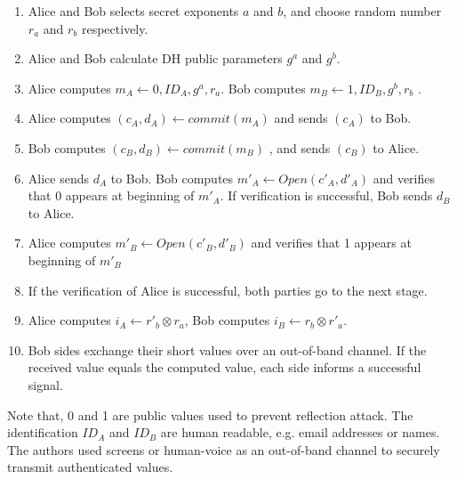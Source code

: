 \begin{enumerate}
\item Alice and Bob selects secret exponents $a$ and $b$, and choose random number $r_a$ and $r_b$ respectively. 
\item Alice and Bob calculate DH public parameters $g^a$ and $g^b$. 
\item Alice computes $m_A \leftarrow 0,ID_A,g^a,r_a$. Bob computes $m_B \leftarrow 1,ID_B,g^b,r_b$ .
\item Alice computes $(c_A,d_A) \leftarrow commit(m_A)$ and sends $(c_A)$ to Bob.
\item Bob computes $(c_B,d_B) \leftarrow commit(m_B)$ , and sends $(c_B)$ to Alice.
\item Alice sends $d_A$ to Bob. Bob computes $m'_A \leftarrow Open(c'_A,d'_A)$ and verifies that 0 appears at beginning of $m'_A$. If verification is successful, Bob sends $d_B$ to Alice.
\item Alice computes $m'_B \leftarrow Open(c'_B,d'_B)$ and verifies that 1 appears at beginning of $m'_B$
 \item If the verification of Alice is successful, both parties go to the next stage.
\item Alice computes $i_A \leftarrow r'_b \otimes r_a$, Bob computes $i_B \leftarrow r_b \otimes r'_a$.
\item Bob sides exchange their short values over an out-of-band channel. If the received value equals the computed value, each side informs a successful signal. 
\end{enumerate}

Note that, 0 and 1 are public values used to prevent reflection attack. The identification $ID_A$ and $ID_B$ are human readable, e.g. email addresses or names. The authors used screens or human-voice as an out-of-band channel to securely transmit authenticated values.
 

